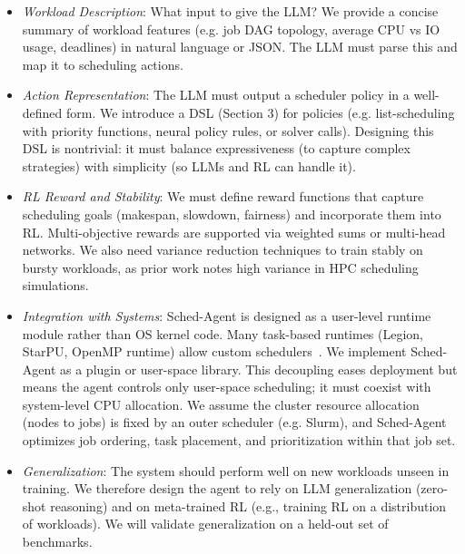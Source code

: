 \begin{itemize}
\item \emph{Workload Description}: What input to give the LLM? We provide a concise summary of workload features (e.g. job DAG topology, average CPU vs IO usage, deadlines) in natural language or JSON. The LLM must parse this and map it to scheduling actions.
\item \emph{Action Representation}: The LLM must output a scheduler policy in a well-defined form. We introduce a DSL (Section 3) for policies (e.g. list-scheduling with priority functions, neural policy rules, or solver calls). Designing this DSL is nontrivial: it must balance expressiveness (to capture complex strategies) with simplicity (so LLMs and RL can handle it).
\item \emph{RL Reward and Stability}: We must define reward functions that capture scheduling goals (makespan, slowdown, fairness) and incorporate them into RL. Multi-objective rewards are supported via weighted sums or multi-head networks. We also need variance reduction techniques to train stably on bursty workloads, as prior work notes high variance in HPC scheduling simulations.
\item \emph{Integration with Systems}: Sched-Agent is designed as a user-level runtime module rather than OS kernel code. Many task-based runtimes (Legion, StarPU, OpenMP runtime) allow custom schedulers~\cite{arxiv2404}. We implement Sched-Agent as a plugin or user-space library. This decoupling eases deployment but means the agent controls only user-space scheduling; it must coexist with system-level CPU allocation. We assume the cluster resource allocation (nodes to jobs) is fixed by an outer scheduler (e.g. Slurm), and Sched-Agent optimizes job ordering, task placement, and prioritization within that job set.
\item \emph{Generalization}: The system should perform well on new workloads unseen in training. We therefore design the agent to rely on LLM generalization (zero-shot reasoning) and on meta-trained RL (e.g., training RL on a distribution of workloads). We will validate generalization on a held-out set of benchmarks.
\end{itemize}